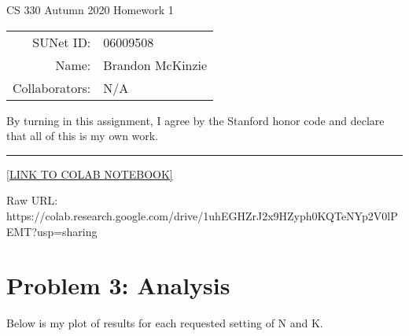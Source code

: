 \documentclass[11pt]{article}
\begin{document}
\begin{center}
	{\Large CS 330 Autumn 2020 Homework 1}
	
	\begin{tabular}{rl}
		SUNet ID: & 06009508 \\
		Name: & Brandon McKinzie \\
		Collaborators: & N/A
	\end{tabular}
\end{center}

\p By turning in this assignment, I agree by the Stanford honor code and declare
that all of this is my own work.

\rule{\linewidth}{0.4pt}

\href{https://colab.research.google.com/drive/1uhEGHZrJ2x9HZyph0KQTeNYp2V0lPEMT?usp=sharing}{[LINK TO COLAB NOTEBOOK]}

Raw URL: https://colab.research.google.com/drive/1uhEGHZrJ2x9HZyph0KQTeNYp2V0lPEMT?usp=sharing

\section*{Problem 3: Analysis}

Below is my plot of results for each requested setting of N and K. 

\end{document}

